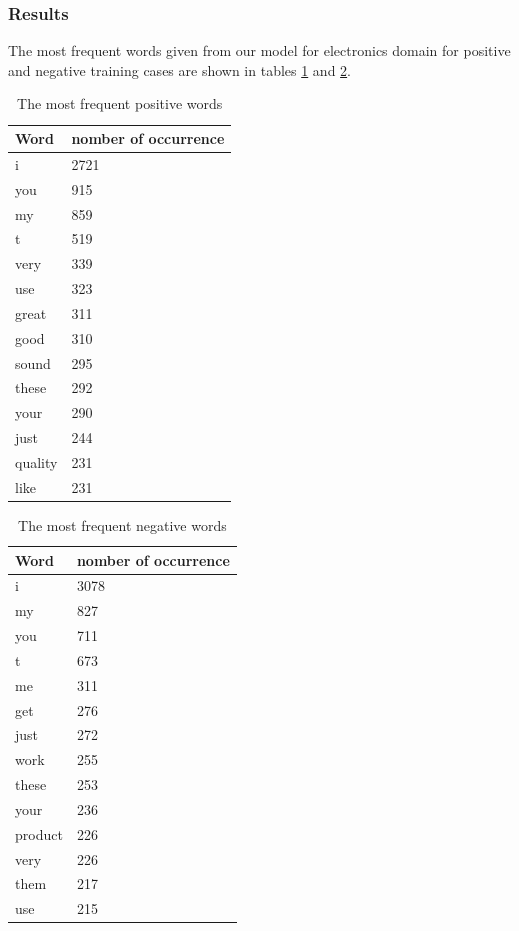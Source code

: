 \documentclass[10pt, a4paper]{article}
\begin{document}
\subsubsection{Results}

The most frequent words given from our model for electronics domain for positive and negative training cases are shown in tables \ref{tab:mostFreqWordsPos} and \ref{tab:mostFreqWordsNeg}.

\begin{table}[ht]
\caption{The most frequent positive words}
\label{tab:mostFreqWordsPos}
\begin{center}
\begin{tabular}{ll}
\toprule
Word & nomber of occurrence \\
\midrule
i & 2721 \\ 
you & 915 \\ 
my & 859 \\ 
t & 519 \\ 
very & 339 \\ 
use & 323 \\ 
great & 311 \\ 
good & 310 \\ 
sound & 295 \\ 
these & 292 \\ 
your & 290 \\ 
just & 244 \\ 
quality & 231 \\ 
like & 231 \\ 
\bottomrule
\end{tabular}
\end{center}
\end{table}

\begin{table}[ht]
\caption{The most frequent negative words}
\label{tab:mostFreqWordsNeg}
\begin{center}
\begin{tabular}{ll}
\toprule
Word & nomber of occurrence \\
\midrule
i & 3078 \\ 
my & 827 \\ 
you & 711 \\ 
t & 673 \\ 
me & 311 \\ 
get & 276 \\ 
just & 272 \\ 
work & 255 \\ 
these & 253 \\ 
your & 236 \\ 
product & 226 \\ 
very & 226 \\ 
them & 217 \\ 
use & 215 \\
\bottomrule
\end{tabular}
\end{center}
\end{table}
\end{document}
